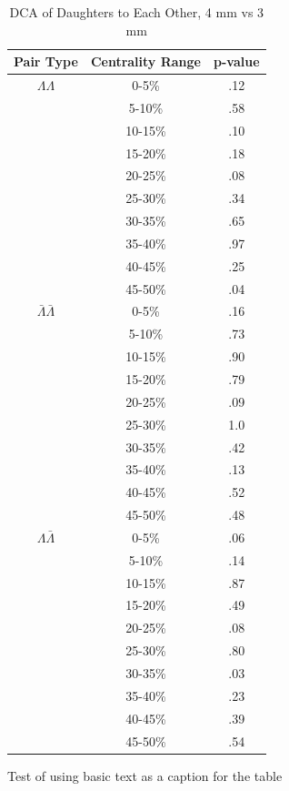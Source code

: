 \begin{table}
\caption {DCA of Daughters to Each Other, 4 mm vs 3 mm} \label{tab:DcaDaughtersEachOtherPvalueTests4mmVs3mm}
\begin{center}
\begin{tabular}{| c | c | c |}
  \hline                       
  Pair Type & Centrality Range & p-value \\
  \hline
  $\Lambda\Lambda$ & 0-5\% & .12 \\
   & 5-10\%  & .58 \\
   & 10-15\% & .10 \\
   & 15-20\% & .18 \\
   & 20-25\% & .08 \\
   & 25-30\% & .34 \\
   & 30-35\% & .65 \\
   & 35-40\% & .97 \\
   & 40-45\% & .25 \\
   & 45-50\% & .04 \\
   \hline
  $\bar{\Lambda}\bar{\Lambda}$ &  0-5\% & .16 \\
   & 5-10\% & .73 \\
   & 10-15\% & .90 \\
   & 15-20\% & .79 \\
   & 20-25\% & .09 \\
   & 25-30\% & 1.0 \\
   & 30-35\% & .42 \\
   & 35-40\% & .13 \\
   & 40-45\% & .52 \\
   & 45-50\% & .48 \\
   \hline
  $\Lambda\bar{\Lambda}$ &  0-5\% & .06 \\
   & 5-10\% & .14 \\
   & 10-15\% & .87 \\
   & 15-20\% & .49 \\
   & 20-25\% & .08 \\
   & 25-30\% & .80 \\
   & 30-35\% & .03 \\
   & 35-40\% & .23 \\
   & 40-45\% & .39 \\
   & 45-50\% & .54 \\
  \hline  
\end{tabular}
Test of using basic text as a caption for the table
\end{center}
\end{table}





